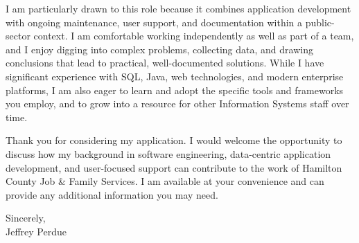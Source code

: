 \documentclass[letterpaper,11pt]{article}
\begin{document}
I am particularly drawn to this role because it combines application development with ongoing maintenance, user support, and documentation within a public-sector context. I am comfortable working independently as well as part of a team, and I enjoy digging into complex problems, collecting data, and drawing conclusions that lead to practical, well-documented solutions. While I have significant experience with SQL, Java, web technologies, and modern enterprise platforms, I am also eager to learn and adopt the specific tools and frameworks you employ, and to grow into a resource for other Information Systems staff over time.

Thank you for considering my application. I would welcome the opportunity to discuss how my background in software engineering, data-centric application development, and user-focused support can contribute to the work of Hamilton County Job \& Family Services. I am available at your convenience and can provide any additional information you may need.

Sincerely,\\

Jeffrey Perdue
\end{document}
